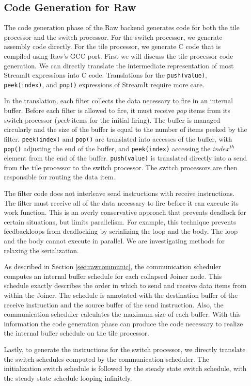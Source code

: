 \subsection{Code Generation for Raw}

The code generation phase of the Raw backend generates code for both
the tile processor and the switch processor.  For the switch
processor, we generate assembly code directly.  For the tile
processor, we generate C code that is compiled using Raw's GCC port.
First we will discuss the tile processor code generation.  We can
directly translate the intermediate representation of most StreamIt
expressions into C code.  Translations for the {\tt push(value)}, {\tt
peek(index)}, and {\tt pop()} expressions of StreamIt require more
care.

In the translation, each filter collects the data necessary to fire in
an internal buffer.  Before each filter is allowed to fire, it must
receive \emph{pop} items from its switch processor (\emph{peek} items
for the initial firing).  The buffer is managed circularly and the
size of the buffer is equal to the number of items peeked by the
filter.  {\tt peek(index)} and {\tt pop()} are translated into
accesses of the buffer, with {\tt pop()} adjusting the end of the
buffer, and {\tt peek(index)} accessing the $index^{th}$ element from
the end of the buffer.  {\tt push(value)} is translated directly into
a send from the tile processor to the switch processor.  The switch
processors are then responsible for routing the data item.

The filter code does not interleave send instructions with receive
instructions.  The filter must receive all of the data necessary to
fire before it can execute its work function.  This is an overly
conservative approach that prevents deadlock for certain situations,
but limits parallelism.  For example, this technique prevents
feedbackloops from deadlocking by serializing the loop and the body.
The loop and the body cannot execute in parallel.  We are
investigating methods for relaxing the serialization.

As described in Section \ref{sec:rawcommunic}, the communication
scheduler computes an internal buffer schedule for each collapsed
Joiner node.  This schedule exactly describes the order in which to
send and receive data items from within the Joiner.  The schedule is
annotated with the destination buffer of the receive instruction and
the source buffer of the send instruction.  Also, the communication
scheduler calculates the maximum size of each buffer.  With this
information the code generation phase can produce the code necessary
to realize the internal buffer schedule on the tile processor.

Lastly, to generate the instructions for the switch processor, we
directly translate the switch schedules computed by the communication
scheduler.  The initialization switch schedule is followed by the steady
state switch schedule, with the steady state schedule looping infinitely.
